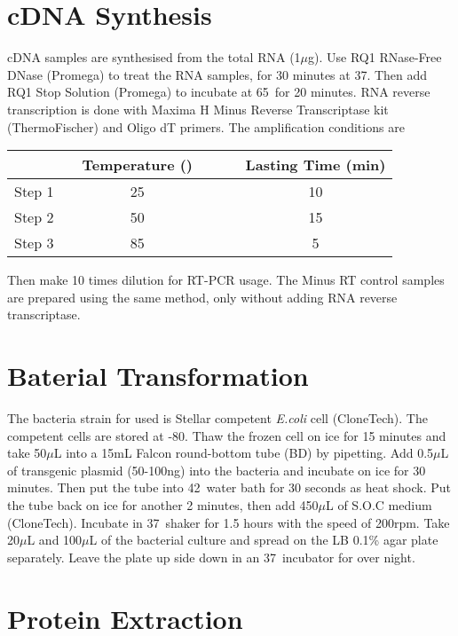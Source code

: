 \section{cDNA Synthesis}
cDNA samples are synthesised from the total RNA (1$\mu$g). Use RQ1 RNase-Free DNase (Promega) to treat the RNA samples, for 30 minutes at 37\textcelsius. Then add RQ1 Stop Solution (Promega) to incubate at 65\textcelsius~for 20 minutes. RNA reverse transcription is done with Maxima H Minus Reverse Transcriptase kit (ThermoFischer) and Oligo dT primers. The amplification conditions are \\
\linebreak
\begin{tabular}[H]{c c c c c}
	\hline
	~~~ & &\textsf{\textbf{Temperature (\textcelsius)}} & ~~~ & \textsf{\textbf{Lasting Time (min)}} \\
	\hline
	Step 1 & & 25 & & 10 \\
	Step 2 & & 50 & & 15 \\
	Step 3 & & 85 & & 5 \\
	\hline
\end{tabular}
\linebreak
\linebreak
Then make 10 times dilution for RT-PCR usage. The Minus RT control samples are prepared using the same method, only without adding RNA reverse transcriptase.

\section{Baterial Transformation}
The bacteria strain for used is Stellar competent \textit{E.coli} cell (CloneTech).
The competent cells are stored at -80\textcelsius. Thaw the frozen cell on ice for 15 minutes and take 50$\mu$L into a 15mL Falcon round-bottom tube (BD) by pipetting. Add 0.5$\mu$L of transgenic plasmid (50-100ng) into the bacteria and incubate on ice for 30 minutes. Then put the tube into 42\textcelsius~water bath for 30 seconds as heat shock. Put the tube back on ice for another 2 minutes, then add 450$\mu$L of S.O.C medium (CloneTech). Incubate in 37\textcelsius~shaker for 1.5 hours with the speed of 200rpm. Take 20$\mu$L and 100$\mu$L of the bacterial culture and spread on the LB 0.1\% agar plate separately. Leave the plate up side down in an 37\textcelsius~incubator for over night. 
\section{Protein Extraction}
